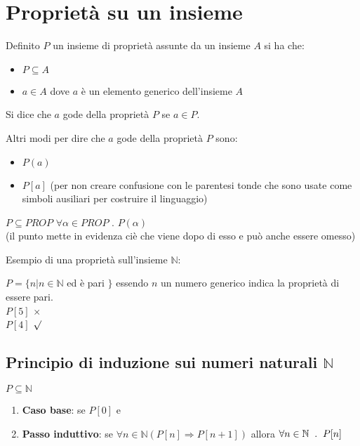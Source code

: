 \documentclass{article}
\theoremstyle{break}
\theoremstyle{break}
\theoremstyle{break}
\theoremstyle{break}
\begin{document}
\section{Proprietà su un insieme}
Definito \( P \) un insieme di proprietà assunte da un insieme \( A \) si ha che:
\begin{itemize}
	\item \( P \subseteq A \)
	\item \( a \in A \) dove \( a \) è un elemento generico dell'insieme \( A \)
\end{itemize}
Si dice che \( a \) gode della proprietà \( P \) se \( a \in P \).

Altri modi per dire che \( a \) gode della proprietà \( P \) sono:
\begin{itemize}
	\item \( P(a) \)
	\item \( P[a] \) (per non creare confusione con le parentesi tonde che sono
	      usate come simboli ausiliari per costruire il linguaggio)
\end{itemize}

\( P \subseteq PROP \)\hspace{5mm} \( \forall \alpha \in PROP \) \( . \) \( P(\alpha ) \)\\
(il punto mette in evidenza ciè che viene dopo di esso e può anche essere omesso)

\begin{example}
	Esempio di una proprietà sull'insieme \( \mathbb{N} \):

	\( P = \{n | n \in \mathbb{N} \) ed è pari \( \} \) essendo \( n \) un numero generico
	indica la proprietà di essere pari.
	\\
	\( P[5] \) \( \times  \)\\
	\( P[4] \) \( \surd \)
\end{example}

\subsection{Principio di induzione sui numeri naturali \( \mathbb{N} \)}
\( P \subseteq \mathbb{N} \)
\begin{enumerate}
	\item \textbf{Caso base}: se \( P[0] \) e
	\item \textbf{Passo induttivo}: se \( \forall n \in \mathbb{N} (P[n] \Rightarrow P[n+1]) \)
	      allora \( \forall n \in \mathbb{N} \hspace{2mm} . \hspace{2mm} P[n] \)
\end{enumerate}
\end{document}
